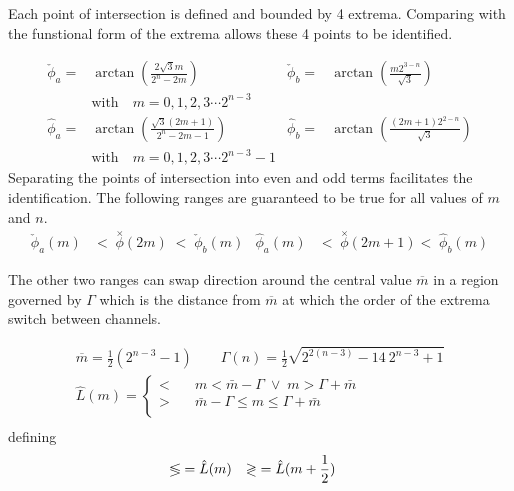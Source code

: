Each point of intersection is defined and bounded by 4 extrema. Comparing with the funstional form of the extrema allows these 4 points to be identified.

\begin{align*}
 \check{\phi}_{a} = & \arctan\left(\frac{2 \sqrt{3} m}{2^n - 2 m}\right) &
 \check{\phi}_{b} = & \arctan\left(\frac{m 2^{3-n}}{\sqrt{3}}       \right) \\ 
 & \text{with}\quad   m =  0,1,2,3 \cdots2^{n-3} \\
 \hat{\phi    }_{a}  = & \arctan\left(\frac{\sqrt{3} (2 m+1)}{2^n-2 m-1}  \right) &
 \hat{\phi   }_{b}  = & \arctan\left(\frac{(2 m+1) 2^{2-n}}{\sqrt{3}}          \right) \\
 &\text{with}\quad   m =  0,1,2,3 \cdots2^{n-3}-1 
\end{align*}
Separating the points of intersection into even and odd terms facilitates the identification. The following ranges are guaranteed to be true for all values of $m$ and $n$.
\begin{align*}
 \check{\phi}_{a} (m) & < \; \overset{\times}{\phi} (2m)   \;    <  \;\check{\phi}_{b}(m)  & 
      \hat{\phi}_{a}(m) & < \;  \overset{\times}{\phi} (2m+1)  < \;    \hat{\phi}_{b}(m)  
\end{align*}

The other two ranges can swap direction around the central value  $\overline{m}$ in a region governed by $\Gamma$ which is the distance from $\overline{m}$ at which the order of the extrema switch between channels.

\begin{gather*}
\overline{m}=\frac{1}{2} \left(2^{n-3}-1\right) \qquad
\varGamma(n)=\frac{1}{2} \sqrt{2^{2 (n-3)}-14\ 2^{n-3}+1} \\
\hat{L}(m)=\begin{cases}
< & \quad m < \bar{m}-\Gamma \; \vee  \; m > \Gamma +\bar{m} \\
> & \quad \bar{m}-\Gamma \leq m \leq \Gamma +\bar{m}\\
\end{cases} \\
\end{gather*}
defining
\begin{align}
\lessgtr &= \hat{L}(\scriptsize{m})  & \gtrless &= \hat{L}(\scriptsize{m+\frac{1}{2}})
\end{align}


